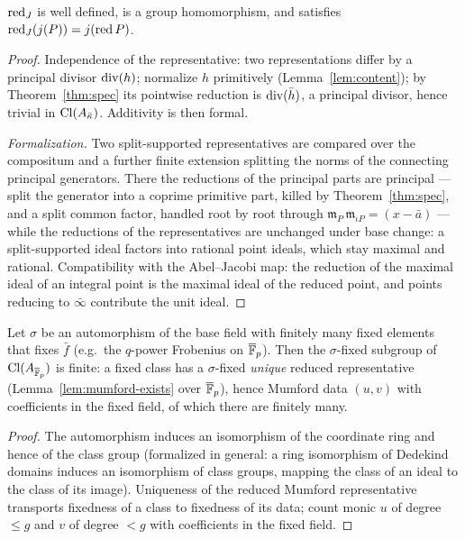 \begin{theorem}
\label{thm:redJ-hom}
\leanok
{}
$\operatorname{red}_J$ is well defined, is a group homomorphism, and satisfies
$\operatorname{red}_J(j(P)) = j(\operatorname{red} P)$.
\end{theorem}
\begin{proof}
\leanok
Independence of the representative: two representations differ by a principal divisor
$\operatorname{div}(h)$; normalize $h$ primitively (Lemma~\ref{lem:content}); by
Theorem~\ref{thm:spec} its pointwise reduction is $\operatorname{div}(\bar h)$, a principal
divisor, hence trivial in $\operatorname{Cl}(A_{\bar\kappa})$. Additivity is then formal.

\emph{Formalization.} Two split-supported representatives are compared over the
compositum and a further finite extension splitting the norms of the connecting
principal generators. There the reductions of the principal parts are principal ---
split the generator into a coprime primitive part, killed by Theorem~\ref{thm:spec},
and a split common factor, handled root by root through
$\mathfrak m_P\,\mathfrak m_{\iota P} = (x - \bar a)$ --- while the reductions of the
representatives are unchanged under base change: a split-supported ideal factors into
rational point ideals, which stay maximal and rational. Compatibility with the
Abel--Jacobi map: the reduction of the maximal ideal of an integral point is the maximal
ideal of the reduced point, and points reducing to $\bar\infty$ contribute the unit
ideal.
\end{proof}

\begin{lemma}
\label{lem:frobfix-finite}
\leanok
{}
Let $\sigma$ be an automorphism of the base field with finitely many fixed elements that
fixes $\bar f$ (e.g.\ the $q$-power Frobenius on $\overline{\mathbb{F}}_p$). Then the $\sigma$-fixed
subgroup of $\operatorname{Cl}(A_{\overline{\mathbb{F}}_p})$ is finite: a fixed class has a $\sigma$-fixed
\emph{unique} reduced representative (Lemma~\ref{lem:mumford-exists} over $\overline{\mathbb{F}}_p$),
hence Mumford data $(u,v)$ with coefficients in the fixed field, of which there are
finitely many.
\end{lemma}
\begin{proof}
\leanok
The automorphism induces an isomorphism of the coordinate ring and hence of the class
group (formalized in general: a ring isomorphism of Dedekind domains induces an
isomorphism of class groups, mapping the class of an ideal to the class of its image).
Uniqueness of the reduced Mumford representative transports fixedness of a class to
fixedness of its data; count monic $u$ of degree $\le g$ and $v$ of degree $< g$ with
coefficients in the fixed field.
\end{proof}

